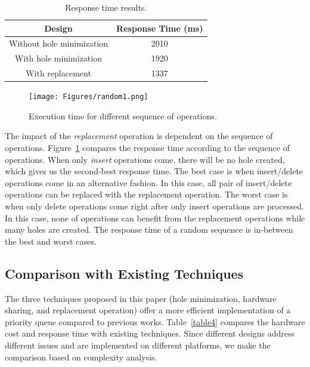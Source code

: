 \documentclass[10pt, conference, compsocconf]{IEEEtran}
\begin{document}
\begin{table}
 \begin{center}
 \caption{Response time results.}
\label{table3}
\begin{tabular}{ |c|c|}
 \hline
 Design  &  Response Time (ms) \\
 \hline
Without hole minimization & 2010 \\
  \hline
With hole minimization & 1920 \\
  \hline
With replacement & 1337 \\
  \hline
\end{tabular}
\end{center}
\end{table}

\begin{figure}[!ht]
  \centering
  \texttt{[image: Figures/random1.png]}
      \caption{Execution time for different sequence of operations.}
    \label{random}
\end{figure}



The impact of the {\it replacement} operation is dependent on the sequence of operations.
Figure~\ref{random} compares the response time according to the sequence of operations.
When only {\it insert} operations come, there will be no hole created, which gives us the second-best response time.
The best case is when insert/delete operations come in an alternative fashion.
In this case, all pair of insert/delete operations can be replaced with the replacement operation.
The worst case is when only delete operations come right after only insert operations are processed.
In this case, none of operations can benefit from the replacement operations while many holes are created.
The response time of a random sequence is in-between the best and worst cases.

\subsection{Comparison with Existing Techniques}

The three techniques proposed in this paper (hole minimization, hardware sharing, and replacement operation) offer a more efficient implementation of a priority queue compared to previous works.
Table~\ref{table4} compares the hardware cost and response time with existing techniques.
Since different designs address different issues and are implemented on different platforms, we make the comparison based on complexity analysis.
\end{document}
